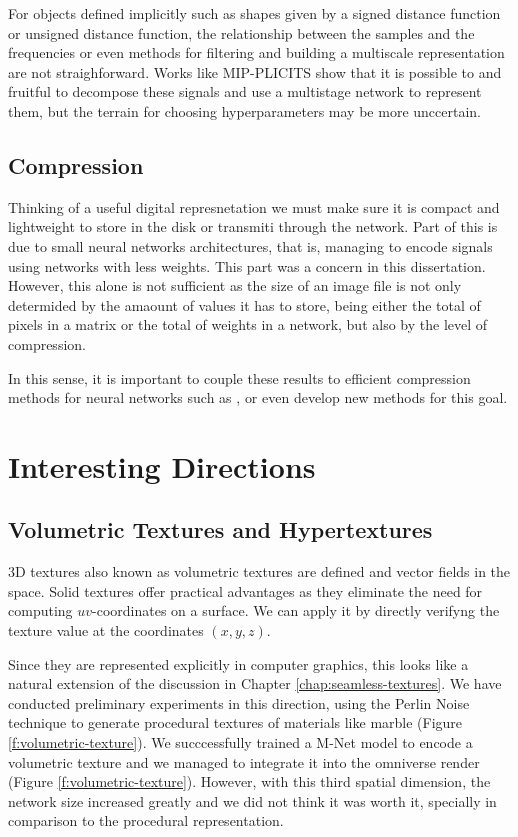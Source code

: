 For objects defined implicitly such as shapes given by a signed distance function or unsigned distance function, the relationship between the samples and the frequencies or even methods for filtering and building a multiscale representation are not straighforward. Works like MIP-PLICITS show that it is possible to and fruitful to decompose these signals and use a multistage network to represent them, but the terrain for choosing hyperparameters may be more unccertain.

\subsection{Compression}

Thinking of a useful digital represnetation we must make sure it is compact and lightweight to store in the disk or transmiti through the network. Part of this is due to small neural networks architectures, that is, managing to encode signals using networks with less weights. This part was a concern in this dissertation. However, this alone is not sufficient as the size of an image file is not only determided by the amaount of values it has to store, being either the total of pixels in a matrix or the total of weights in a network, but also by the level of compression.

In this sense, it is important to couple these results to efficient compression methods for neural networks such as \cite{dupont2021coin}, \cite{dupont2022coinpp} or even develop new methods for this goal.


\section{Interesting Directions}

\subsection{Volumetric Textures and Hypertextures}
\label{sec:3Dtextures}

3D textures also known as volumetric textures are defined and vector fields in the space. Solid textures offer practical advantages as they eliminate the need for computing $uv$-coordinates on a surface. We can apply it by directly verifyng the texture value at the coordinates $(x, y, z)$. 

Since they are represented explicitly in computer graphics, this looks like a natural extension of the discussion in Chapter \ref{chap:seamless-textures}. We have conducted preliminary experiments in this direction, using the Perlin Noise technique to generate procedural textures of materials like marble (Figure \ref{f:volumetric-texture}). We succcessfully trained a M-Net model to encode a volumetric texture and we managed to integrate it into the omniverse render (Figure \ref{f:volumetric-texture}). However, with this third spatial dimension, the network size increased greatly and we did not think it was worth it, specially in comparison to the procedural representation.

